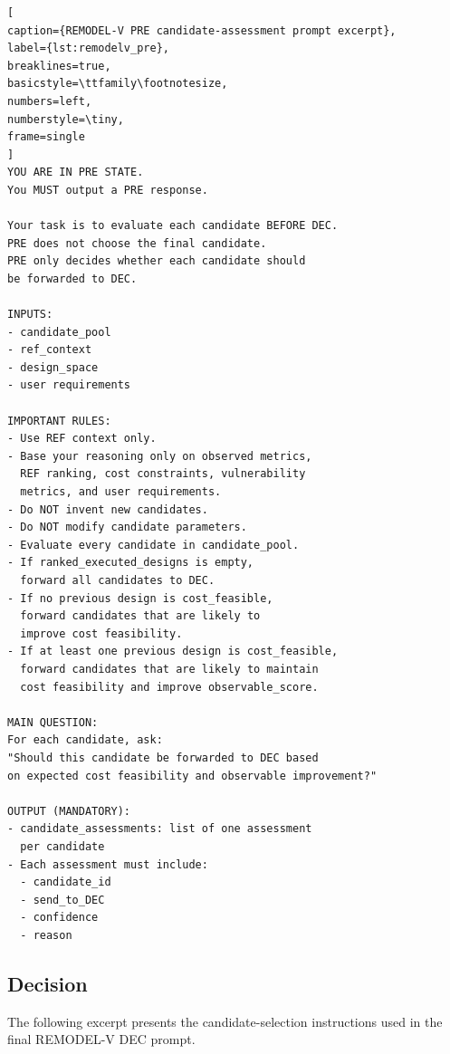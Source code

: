 \begin{lstlisting}[
caption={REMODEL-V PRE candidate-assessment prompt excerpt},
label={lst:remodelv_pre},
breaklines=true,
basicstyle=\ttfamily\footnotesize,
numbers=left,
numberstyle=\tiny,
frame=single
]
YOU ARE IN PRE STATE.
You MUST output a PRE response.

Your task is to evaluate each candidate BEFORE DEC.
PRE does not choose the final candidate.
PRE only decides whether each candidate should
be forwarded to DEC.

INPUTS:
- candidate_pool
- ref_context
- design_space
- user requirements

IMPORTANT RULES:
- Use REF context only.
- Base your reasoning only on observed metrics,
  REF ranking, cost constraints, vulnerability
  metrics, and user requirements.
- Do NOT invent new candidates.
- Do NOT modify candidate parameters.
- Evaluate every candidate in candidate_pool.
- If ranked_executed_designs is empty,
  forward all candidates to DEC.
- If no previous design is cost_feasible,
  forward candidates that are likely to
  improve cost feasibility.
- If at least one previous design is cost_feasible,
  forward candidates that are likely to maintain
  cost feasibility and improve observable_score.

MAIN QUESTION:
For each candidate, ask:
"Should this candidate be forwarded to DEC based
on expected cost feasibility and observable improvement?"

OUTPUT (MANDATORY):
- candidate_assessments: list of one assessment
  per candidate
- Each assessment must include:
  - candidate_id
  - send_to_DEC
  - confidence
  - reason
\end{lstlisting}


\subsection{Decision}
\label{app:remodelv_prompts_dec}


The following excerpt presents the candidate-selection
instructions used in the final REMODEL-V DEC prompt.

